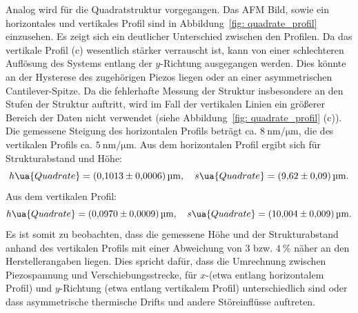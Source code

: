 Analog wird für die Quadratstruktur vorgegangen. Das AFM Bild, sowie ein horizontales und vertikales Profil sind
in Abbildung~\ref{fig: quadrate_profil} einzusehen. Es zeigt sich ein deutlicher Unterschied zwischen den Profilen.
Da das vertikale Profil (c) wesentlich stärker verrauscht ist, kann von einer schlechteren Auflösung des Systems
entlang der $y$-Richtung ausgegangen werden. Dies könnte an der Hysterese des zugehörigen Piezos liegen oder an
einer asymmetrischen Cantilever-Spitze. Da die fehlerhafte Messung der Struktur insbesondere an den Stufen der Struktur
auftritt, wird im Fall der vertikalen Linien ein größerer Bereich der Daten nicht verwendet (siehe
Abbildung~\ref{fig: quadrate_profil} (c)). Die gemessene Steigung des horizontalen Profils beträgt ca.
$\SI{8}{\nano\meter\per\micro\meter}$, die des vertikalen Profils ca. $\SI{5}{\nano\meter\per\micro\meter}$.
Aus dem horizontalen Profil ergibt sich für Strukturabstand und Höhe:
\begin{equation}
  h\ua{Quadrate} = \SI{0.1013(6)}{\micro\meter}, \quad s\ua{Quadrate} = \SI{9.62(9)}{\micro\meter}.
\end{equation}
Aus dem vertikalen Profil:
\begin{equation}
  h\ua{Quadrate} = \SI{0.0970(9)}{\micro\meter}, \quad s\ua{Quadrate} = \SI{10.004(9)}{\micro\meter}.
\end{equation}
Es ist somit zu beobachten, dass die gemessene Höhe und der Strukturabstand anhand des vertikalen Profils mit einer
Abweichung von $3$ bzw. $\SI{4}{\percent}$ näher an den Herstellerangaben liegen. Dies spricht dafür, dass
die Umrechnung zwischen Piezospannung und Verschiebungsstrecke, für $x$-(etwa entlang horizontalem Profil) und $y$-Richtung (etwa
entlang vertikalem Profil) unterschiedlich sind oder dass asymmetrische thermische Drifts und andere Störeinflüsse auftreten.
